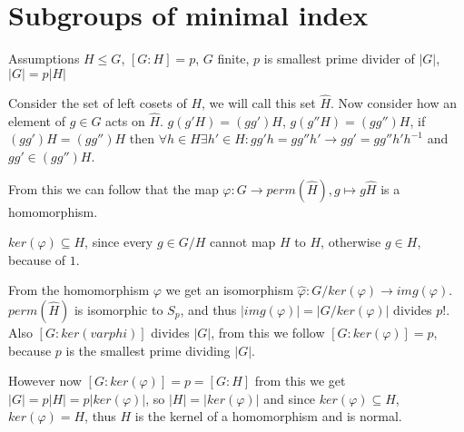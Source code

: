 \section{Subgroups of minimal index}
Assumptions $H \leq G$, $[G:H]=p$, $G$ finite, $p$ is smallest prime divider of $|G|$, $|G|=p|H|$

Consider the set of left cosets of $H$, we will call this set $\hat{H}$. Now consider how an element of $g\in G$ acts on $\hat{H}$. $g(g'H)=(gg')H$, $g(g''H)=(gg'')H$, if $(gg')H=(gg'')H$ then $\forall h \in H \exists h' \in H : gg'h=gg''h' \rightarrow gg'=gg''h'h^{-1}$ and $gg' \in (gg'')H$. 

From this we can follow that the map $\varphi : G \rightarrow perm(\hat{H}), g \mapsto g\hat{H}$ is a homomorphism.

$ker(\varphi) \subseteq H$, since every $g \in G/H$ cannot map $H$ to $H$, otherwise $g \in H$, because of $1$. 

From the homomorphism $\varphi$ we get an isomorphism $\hat{\varphi}: G/ker(\varphi) \rightarrow img(\varphi)$. $perm(\hat{H})$ is isomorphic to $S_p$, and thus $|img(\varphi)|=|G/ker(\varphi)|$ divides $p!$. Also $[G:ker(varphi)]$ divides $|G|$, from this we follow $[G:ker(\varphi)]=p$, because $p$ is the smallest prime dividing $|G|$. 

However now $[G:ker(\varphi)]=p=[G:H]$ from this we get $|G|=p|H|=p|ker(\varphi)|$, so $|H|=|ker(\varphi)|$ and since $ker(\varphi) \subseteq H$, $ker(\varphi)=H$, thus $H$ is the kernel of a homomorphism and is normal. 